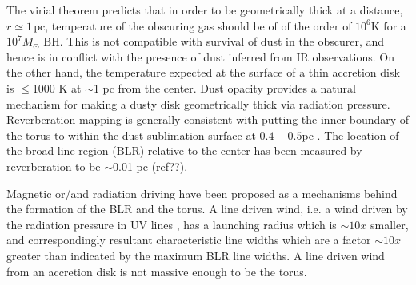 \documentclass[12pt,english,preprint]{aastex}
\newcommand{\su}[2]{#1_{\rm #2}}
\newcommand{\rsub}{ \su{R}{sub} }
\begin{document}
The virial theorem predicts
that in order to be geometrically thick at a distance, $r\simeq1\,\text{pc}$,  
temperature of the obscuring gas should be of of the order of $10^{6}\text{K}$ for
a $10^{7}M_{\odot}$ BH. This is not compatible with survival of dust in the obscurer,
and hence is in conflict with the presence of dust inferred from IR observations.
On the other hand, the temperature expected at the surface of a thin accretion disk 
is $\leq$1000 K at $\sim$1 pc from the center.
Dust opacity provides a natural mechanism for making a dusty disk geometrically thick 
via radiation pressure.  
Reverberation mapping \citep[i.e.][]{Koshida2014} is generally consistent
 with putting the inner boundary of the torus to 
within the dust sublimation surface at $0.4-0.5$pc \citep{Kaspi2000}.
The location of the broad line region (BLR) relative to the center has been measured 
by reverberation to be $\sim$0.01 pc (ref??).

Magnetic or/and radiation driving have been proposed as a mechanisms behind the formation of the BLR and the torus.
A line driven wind, i.e. a wind driven by the radiation pressure in UV lines \citep{ProgaKallman2004,Murr05}, 
has a launching radius which is $\sim 10x$ smaller, and correspondingly  resultant characteristic 
line widths which are a factor $\sim 10x$ greater than indicated by the maximum BLR line widths. A line driven wind from an accretion disk is not massive enough to be the torus. 
\end{document}
